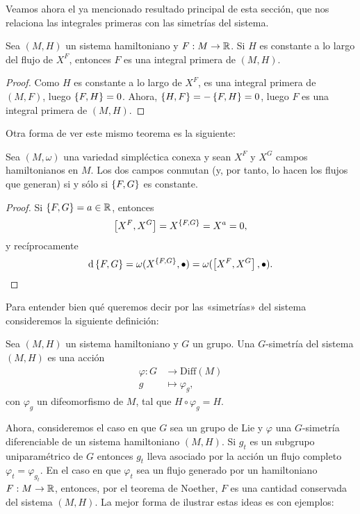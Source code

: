 Veamos ahora el ya mencionado resultado principal de esta sección, que nos relaciona las integrales primeras con las simetrías del sistema.
  \begin{prop}
    Sea $(M,H)$ un sistema hamiltoniano y $F:M \rightarrow \mathbb{R}$. Si $H$ es constante a lo largo del flujo de $X^F$, entonces $F$ es una integral primera de $(M,H)$. 
  \end{prop}
  \begin{proof}
    Como $H$ es constante a lo largo de $X^F$, es una integral primera de $(M,F)$, luego $\left\lbrace F,H\right\rbrace=0$. Ahora, $\left\lbrace H,F\right\rbrace=-\left\lbrace F,H\right\rbrace=0$, luego $F$ es una integral primera de $(M,H)$. 
  \end{proof}
Otra forma de ver este mismo teorema es la siguiente:
\begin{prop}
  Sea $(M,\omega)$ una variedad simpléctica conexa y sean $X^F$ y $X^G$ campos hamiltonianos en $M$. Los dos campos conmutan (y, por tanto, lo hacen los flujos que generan) si y sólo si $\left\lbrace F,G\right\rbrace$ es constante. 
\end{prop}
\begin{proof}
  Si $\left\lbrace F,G\right\rbrace=a \in \mathbb{R}$, entonces
  \begin{equation*}
    \left[X^F,X^G\right]= X^{\left\lbrace F,G\right\rbrace} = X^a=0,
  \end{equation*}
  y recíprocamente
  \begin{equation*}
    \mathrm{d}\left\lbrace F,G\right\rbrace=\omega(X^{\left\lbrace F,G\right\rbrace},\bullet)=\omega(\left[X^F,X^G\right],\bullet).
  \end{equation*}
\end{proof}

Para entender bien qué queremos decir por las «simetrías» del sistema consideremos la siguiente definición:
\begin{defn}
  Sea $(M,H)$ un sistema hamiltoniano y $G$ un grupo. Una $G$-simetría del sistema $(M,H)$ es una acción
  \begin{align*}
    \varphi :G&\longrightarrow \mathrm{Diff}(M)\\ 
      g &\longmapsto \varphi_g, 
    \end{align*}
    con $\varphi_g$ un difeomorfismo de $M$, tal que $H\circ \varphi_g = H$.
\end{defn}

Ahora, consideremos el caso en que $G$ sea un grupo de Lie y $\varphi$ una $G$-simetría diferenciable de un sistema hamiltoniano $(M,H)$. Si $g_t$ es un subgrupo uniparamétrico de $G$ entonces $g_t$ lleva asociado por la acción un flujo completo $\varphi_t=\varphi_{g_t}$. En el caso en que $\varphi_t$ sea un flujo generado por un hamiltoniano $F:M\rightarrow \mathbb{R}$, entonces, por el teorema de Noether, $F$ es una cantidad conservada del sistema $(M,H)$. La mejor forma de ilustrar estas ideas es con ejemplos:

